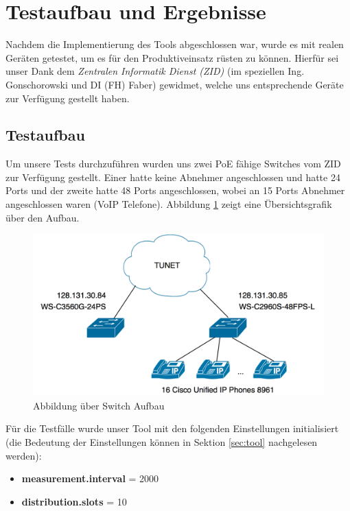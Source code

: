 \section{Testaufbau und Ergebnisse}
\label{sec:test}
Nachdem die Implementierung des Tools abgeschlossen war, wurde es mit realen Geräten getestet, um es für den Produktiveinsatz rüsten zu können. Hierfür sei unser Dank dem \emph{Zentralen Informatik Dienst (ZID)} (im speziellen Ing. Gonschorowski und DI (FH) Faber) gewidmet, welche uns entsprechende Geräte zur Verfügung gestellt haben.

\subsection{Testaufbau}
Um unsere Tests durchzuführen wurden uns zwei PoE fähige Switches vom ZID zur Verfügung gestellt. Einer hatte keine Abnehmer angeschlossen und hatte 24 Ports und der zweite hatte 48 Ports angeschlossen, wobei an 15 Ports Abnehmer angeschlossen waren (VoIP Telefone). Abbildung \ref{fig:switches} zeigt eine Übersichtsgrafik über den Aufbau.

\begin{figure}[h]
    \centering
    \leavevmode
    \includegraphics[width=1.0\linewidth]{figures/network_diagram}
    \caption{Abbildung über Switch Aufbau}
    \label{fig:switches}
\end{figure}

Für die Testfälle wurde unser Tool mit den folgenden Einstellungen initialisiert (die Bedeutung der Einstellungen können in Sektion \ref{sec:tool} nachgelesen werden):
\begin{itemize}
 \item \textbf{measurement.interval} = 2000
 \item \textbf{distribution.slots} = 10
\end{itemize}

